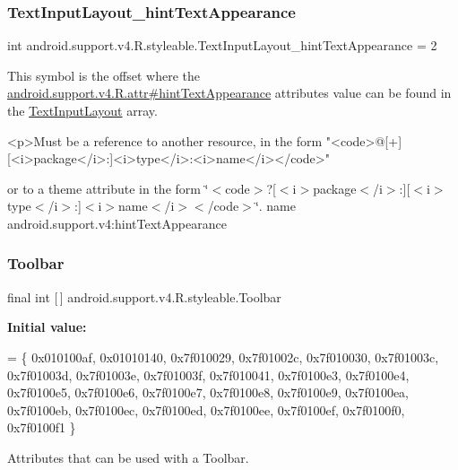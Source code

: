 \subsubsection{\texorpdfstring{Text\+Input\+Layout\+\_\+hint\+Text\+Appearance}{TextInputLayout\_hintTextAppearance}}
{\footnotesize\ttfamily int android.\+support.\+v4.\+R.\+styleable.\+Text\+Input\+Layout\+\_\+hint\+Text\+Appearance = 2\hspace{0.3cm}{\ttfamily [static]}}

This symbol is the offset where the \hyperlink{classandroid_1_1support_1_1v4_1_1R_1_1attr_a858dc23526090905ecc8c3669886a11e}{android.\+support.\+v4.\+R.\+attr\#hint\+Text\+Appearance} attribute\textquotesingle{}s value can be found in the \hyperlink{classandroid_1_1support_1_1v4_1_1R_1_1styleable_a86943debf88d7a9dc4c0627a8546913d}{Text\+Input\+Layout} array.

\begin{DoxyVerb}      <p>Must be a reference to another resource, in the form "<code>@[+][<i>package</i>:]<i>type</i>:<i>name</i></code>"
\end{DoxyVerb}
 or to a theme attribute in the form \char`\"{}$<$code$>$?\mbox{[}$<$i$>$package$<$/i$>$\+:\mbox{]}\mbox{[}$<$i$>$type$<$/i$>$\+:\mbox{]}$<$i$>$name$<$/i$>$$<$/code$>$\char`\"{}.  name android.\+support.\+v4\+:hint\+Text\+Appearance \mbox{\label{classandroid_1_1support_1_1v4_1_1R_1_1styleable_a211358a2f951023c7735caea0fb5ae04}} 
\subsubsection{\texorpdfstring{Toolbar}{Toolbar}}
{\footnotesize\ttfamily final int \mbox{[}$\,$\mbox{]} android.\+support.\+v4.\+R.\+styleable.\+Toolbar\hspace{0.3cm}{\ttfamily [static]}}

{\bfseries Initial value\+:}
\begin{DoxyCode}
= \{
            0x010100af, 0x01010140, 0x7f010029, 0x7f01002c,
            0x7f010030, 0x7f01003c, 0x7f01003d, 0x7f01003e,
            0x7f01003f, 0x7f010041, 0x7f0100e3, 0x7f0100e4,
            0x7f0100e5, 0x7f0100e6, 0x7f0100e7, 0x7f0100e8,
            0x7f0100e9, 0x7f0100ea, 0x7f0100eb, 0x7f0100ec,
            0x7f0100ed, 0x7f0100ee, 0x7f0100ef, 0x7f0100f0,
            0x7f0100f1
        \}
\end{DoxyCode}
Attributes that can be used with a Toolbar. 


